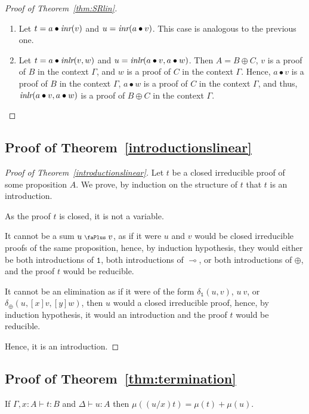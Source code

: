 \documentclass[screen, sigconf,authorversion,nonacm]{acmart}
\theoremstyle{acmdefinition}
\numberwithin{equation}{section}
\newcommand\abstr[1]{[#1]}
\newcommand\inr{\mbox{\it inr}}
\newcommand\inlr{\mbox{\it inlr}}
\newcommand\plus{\mathrel{\text{\normalfont\scalebox{0.7}{\faPlus}}}}
\newcommand\one{\ensuremath{\mathtt 1}}
\newcommand\elimone{\delta_{\one}}
\newcommand\elimplus{\delta_{\oplus}}
\begin{document}
\begin{proof}[Proof of Theorem~\ref{thm:SRlin}]
\begin{enumerate}
		\item Let $t=a \bullet \inr(v)$ and $u=\inr(a \bullet v)$. This case is analogous to the previous one.

		\item Let $t=a \bullet \inlr(v,w) $ and $u=\inlr(a \bullet v,a \bullet w)$. Then $A=B\oplus C$, $v$ is a proof of $B$ in the context $\Gamma$, and $w$ is a proof of $C$ in the context $\Gamma$. Hence, $a \bullet v$ is a proof of $B$ in the context $\Gamma$, $a \bullet w$ is a proof of $C$ in the context $\Gamma$, and thus, $\inlr(a \bullet v,a \bullet w)$ is a proof of $B\oplus C$ in the context $\Gamma$.
    \qedhere
  \end{enumerate}
\end{proof}

\subsection{Proof of Theorem~\ref{introductionslinear}}

\begin{proof}[Proof of Theorem~\ref{introductionslinear}]
Let $t$ be a closed irreducible proof of some proposition $A$. We prove,
by induction on the structure of $t$ that $t$ is an introduction.


As the proof $t$ is closed, it is not a variable.

It cannot be a sum $u \plus v$, as if it were $u$ and $v$ would be
closed irreducible proofs of the same proposition, hence, by induction
hypothesis, they would either be both introductions of $\one$, both
introductions of $\multimap$, or both introductions of $\oplus$, and
the proof $t$ would be reducible.

It cannot be an elimination as if it were of the form $\elimone(u,v)$,
$u~v$, or
$\elimplus(u,\abstr{x}v,\abstr{y}w)$, then $u$ would a closed
irreducible proof, hence, by induction hypothesis, it would an
introduction and the proof $t$ would be reducible.  

Hence, it is an introduction. \qedhere
\end{proof}

\subsection{Proof of Theorem~\ref{thm:termination}}

\begin{lemma}\label{lem:msubst}
If $\Gamma, x:A \vdash t:B$ and $\Delta \vdash u:A$ then
  $\mu((u/x)t) = \mu(t)+\mu(u)$.
\end{lemma}
\end{document}
